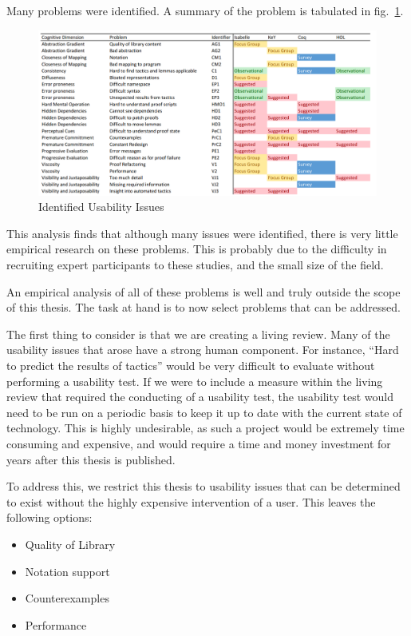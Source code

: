 \documentclass[
]{article}
\providecommand{\tightlist}{%
  \setlength{\itemsep}{0pt}\setlength{\parskip}{0pt}}
\begin{document}
Many problems were identified. A summary of the problem is tabulated in
fig.~\ref{fig:usability_issues}.

\begin{figure}
\hypertarget{fig:usability_issues}{%
\centering
\includegraphics{./Images/MyProblem.png}
\caption{Identified Usability Issues}\label{fig:usability_issues}
}
\end{figure}

This analysis finds that although many issues were identified, there is
very little empirical research on these problems. This is probably due
to the difficulty in recruiting expert participants to these studies,
and the small size of the field.

An empirical analysis of all of these problems is well and truly outside
the scope of this thesis. The task at hand is to now select problems
that can be addressed.

The first thing to consider is that we are creating a living review.
Many of the usability issues that arose have a strong human component.
For instance, ``Hard to predict the results of tactics'' would be very
difficult to evaluate without performing a usability test. If we were to
include a measure within the living review that required the conducting
of a usability test, the usability test would need to be run on a
periodic basis to keep it up to date with the current state of
technology. This is highly undesirable, as such a project would be
extremely time consuming and expensive, and would require a time and
money investment for years after this thesis is published.

To address this, we restrict this thesis to usability issues that can be
determined to exist without the highly expensive intervention of a user.
This leaves the following options:

\begin{itemize}
\tightlist
\item
  Quality of Library
\item
  Notation support
\item
  Counterexamples
\item
  Performance
\end{itemize}
\end{document}
